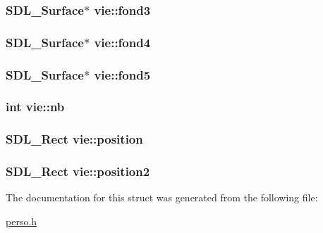 \subsubsection[{\texorpdfstring{fond3}{fond3}}]{\setlength{\rightskip}{0pt plus 5cm}S\+D\+L\+\_\+\+Surface$\ast$ vie\+::fond3}\hypertarget{structvie_a9763ef794bb12262f5826b911d20e42b}{}\label{structvie_a9763ef794bb12262f5826b911d20e42b}
\subsubsection[{\texorpdfstring{fond4}{fond4}}]{\setlength{\rightskip}{0pt plus 5cm}S\+D\+L\+\_\+\+Surface$\ast$ vie\+::fond4}\hypertarget{structvie_a0b08072b8c7ec9e1adfd6e26b4fcb39f}{}\label{structvie_a0b08072b8c7ec9e1adfd6e26b4fcb39f}
\subsubsection[{\texorpdfstring{fond5}{fond5}}]{\setlength{\rightskip}{0pt plus 5cm}S\+D\+L\+\_\+\+Surface$\ast$ vie\+::fond5}\hypertarget{structvie_adabeccdf7e33dd53ac6d85a24fc3931d}{}\label{structvie_adabeccdf7e33dd53ac6d85a24fc3931d}
\subsubsection[{\texorpdfstring{nb}{nb}}]{\setlength{\rightskip}{0pt plus 5cm}int vie\+::nb}\hypertarget{structvie_a02356445cb49a7290950ab15cebccdd9}{}\label{structvie_a02356445cb49a7290950ab15cebccdd9}
\subsubsection[{\texorpdfstring{position}{position}}]{\setlength{\rightskip}{0pt plus 5cm}S\+D\+L\+\_\+\+Rect vie\+::position}\hypertarget{structvie_a916050892cf1e7b8039952dcafa44825}{}\label{structvie_a916050892cf1e7b8039952dcafa44825}
\subsubsection[{\texorpdfstring{position2}{position2}}]{\setlength{\rightskip}{0pt plus 5cm}S\+D\+L\+\_\+\+Rect vie\+::position2}\hypertarget{structvie_a564dc9c3b28da24d81318d703ebc4e59}{}\label{structvie_a564dc9c3b28da24d81318d703ebc4e59}


The documentation for this struct was generated from the following file\+:\begin{DoxyCompactItemize}
\item 
\hyperlink{perso_8h}{perso.\+h}\end{DoxyCompactItemize}
